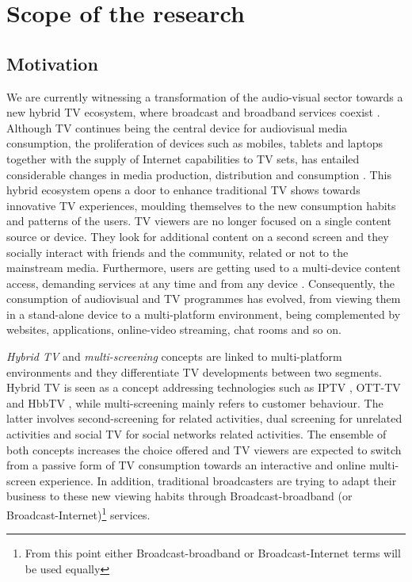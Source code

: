 \chapter{Scope of the research}
\label{chap:introduction}

\section{Motivation}\label{motivation}
We are currently witnessing a transformation of the audio-visual sector towards a new hybrid TV ecosystem, where broadcast and broadband services coexist \cite{Claudy2012}. Although TV continues being the central device for audiovisual media consumption, the proliferation of devices such as mobiles, tablets and laptops together with the supply of Internet capabilities to TV sets, has entailed considerable changes in media production, distribution and consumption \cite{Obrist2015}\cite{McGill2015}. This hybrid ecosystem opens a door to enhance traditional TV shows towards innovative TV experiences, moulding themselves to the new consumption habits and patterns of the users. TV viewers are no longer focused on a single content source or device. They look for additional content on a second screen and they socially interact with friends and the community, related or not to the mainstream media. Furthermore, users are getting used to a multi-device content access, demanding services at any time and from any device \cite{Eastman2012}. Consequently, the consumption of audiovisual and TV programmes has evolved, from viewing them in a stand-alone device to a multi-platform environment, being complemented by websites, applications, online-video streaming, chat rooms and so on.  

\textit{Hybrid TV} and \textit{multi-screening} concepts are linked to multi-platform environments \cite{Bauman2016} and they differentiate TV developments between two segments. Hybrid TV is seen as a concept addressing technologies such as IPTV \cite{iptv} \cite{iptvieee}, OTT-TV \cite{Bauman2016} and HbbTV \cite{hbbtvWeb}, while multi-screening mainly refers to customer behaviour. The latter involves second-screening for related activities, dual screening for unrelated activities and social TV for social networks related activities. The ensemble of both concepts increases the choice offered and TV viewers are expected to switch from a passive form of TV consumption towards an interactive and online multi-screen experience. In addition, traditional broadcasters are trying to adapt their business to these new viewing habits through Broadcast-broadband (or Broadcast-Internet)\footnote{From this point either Broadcast-broadband or Broadcast-Internet terms will be used equally} services.

